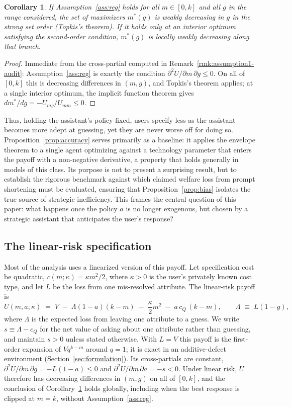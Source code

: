 \documentclass[11pt]{article}
\newtheorem{corollary}{Corollary}
\begin{document}
\begin{corollary}\label{cor:mono}
If Assumption~\ref{ass:reg} holds for all $m \in [0,k]$ and all $g$ in the range considered, the set of maximizers $m^*(g)$ is weakly decreasing in $g$ in the strong set order (Topkis's theorem). If it holds only at an interior optimum satisfying the second-order condition, $m^*(g)$ is locally weakly decreasing along that branch.
\end{corollary}

\begin{proof}
Immediate from the cross-partial computed in Remark~\ref{rmk:assumption1-audit}:
Assumption~\ref{ass:reg} is exactly the condition $\partial^2U/\partial m\,\partial g \le 0$.
On all of $[0,k]$ this is decreasing differences in $(m,g)$, and Topkis's
theorem applies; at a single interior optimum, the implicit function theorem gives
$dm^*/dg = -U_{mg}/U_{mm} \le 0$.
\end{proof}

Thus, holding the assistant's policy fixed, users specify less as the assistant becomes
more adept at guessing, yet they are never worse off for doing so.
Proposition~\ref{prop:accuracy} serves primarily as a baseline: it applies the
envelope theorem to a single agent optimizing against a technology
parameter that enters the payoff with a non-negative derivative, a property that holds
generally in models of this class. Its purpose is not to present a surprising
result, but to establish the rigorous benchmark against which claimed welfare loss from prompt shortening
must be evaluated, ensuring that Proposition~\ref{prop:bias} isolates the
true source of strategic inefficiency. This frames the central question of this paper:
what happens once the policy $a$ is no longer exogenous, but chosen by a strategic
assistant that anticipates the user's response?

\subsection{The linear-risk specification}
\label{sec:linear}
Most of the analysis uses a linearized version of this payoff. Let specification cost be quadratic, $c(m;\kappa) = \kappa m^2/2$, where $\kappa > 0$ is the user's privately known cost type, and let $L$ be the loss from one mis-resolved attribute. The linear-risk payoff is
\[
U(m,a;\kappa) \;=\; V \;-\; \Lambda(1-a)(k-m) \;-\; \frac{\kappa}{2}m^2 \;-\; a\,c_Q\,(k-m), \qquad \Lambda \;\equiv\; L(1-g),
\]
where $\Lambda$ is the expected loss from leaving one attribute to a guess. We write $s \equiv \Lambda - c_Q$ for the net value of asking about one attribute rather than guessing, and maintain $s > 0$ unless stated otherwise. With $L = V$ this payoff is the first-order expansion of $V q^{k-m}$ around $q = 1$; it is exact in an additive-defect environment (Section~\ref{sec:formulation}). Its cross-partials are constant, $\partial^2 U/\partial m\,\partial g = -L(1-a) \le 0$ and $\partial^2 U/\partial m\,\partial a = -s < 0$. Under linear risk, $U$ therefore has decreasing differences in $(m,g)$ on all of $[0,k]$, and the conclusion of Corollary~\ref{cor:mono} holds globally, including when the best response is clipped at $m = k$, without Assumption~\ref{ass:reg}.
\end{document}
